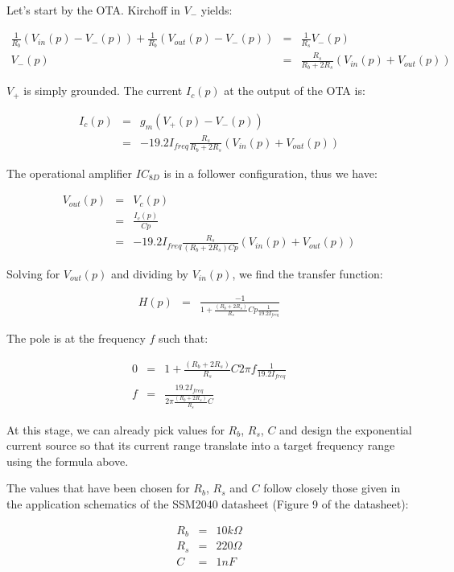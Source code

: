 \documentclass[a4paper,11pt]{article}
\begin{document}
Let's start by the OTA. Kirchoff in $V_-$ yields:

\begin{eqnarray}
\frac{1}{R_b}(V_{in}(p) - V_-(p)) + \frac{1}{R_b} (V_{out}(p) - V_-(p)) &=& \frac{1}{R_s} V_-(p) \\
V_-(p) &=& \frac{R_s}{R_b + 2 R_s} (V_{in}(p) + V_{out}(p))
\end{eqnarray}

$V_+$ is simply grounded. The current $I_c(p)$ at the output of the OTA is:

\begin{eqnarray}
I_c(p) &=& g_m (V_+(p) - V_-(p)) \\
 &=& -19.2 I_{freq} \frac{R_s}{R_b + 2 R_s} (V_{in}(p) + V_{out}(p))
\end{eqnarray}

The operational amplifier $IC_{8D}$ is in a follower configuration, thus we have:

\begin{eqnarray}
V_{out}(p) &=& V_c(p) \\
 &=& \frac{I_c(p)}{Cp} \\
 &=& -19.2 I_{freq} \frac{R_s}{(R_b + 2 R_s)Cp} (V_{in}(p) + V_{out}(p))
\end{eqnarray}

Solving for $V_{out}(p)$ and dividing by $V_{in}(p)$, we find the transfer function:

\begin{eqnarray}
H(p) &=& \frac{-1}{1 + \frac{(R_b + 2 R_s)}{R_s} Cp \frac{1}{19.2 I_{freq}}}
\end{eqnarray}

The pole is at the frequency $f$ such that:

\begin{eqnarray}
0 &=& 1 + \frac{(R_b + 2 R_s)}{R_s} C 2\pi f \frac{1}{19.2 I_{freq}} \\
f &=& \frac{19.2 I_{freq}}{2 \pi \frac{(R_b + 2 R_s)}{R_s} C}
\end{eqnarray}

At this stage, we can already pick values for $R_b$, $R_s$, $C$ and design the exponential current source so that its current range translate into a target frequency range using the formula above.

The values that have been chosen for $R_b$, $R_s$ and $C$ follow closely those given in the application schematics of the SSM2040 datasheet (Figure 9 of the datasheet):

\begin{eqnarray*}
R_b &=& 10 k \Omega \\
R_s &=& 220 \Omega \\
C &=& 1 nF
\end{eqnarray*}
\end{document}
